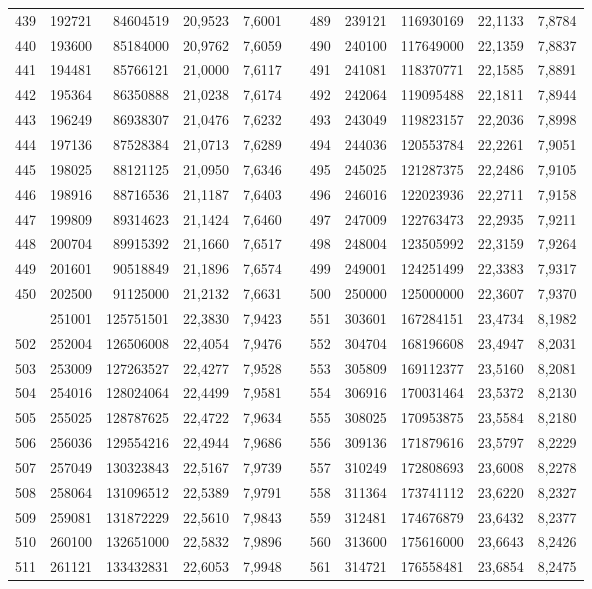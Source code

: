 \begin{longtable}{rrrrrrrrrrr}
439&192721&84604519&20,9523&7,6001&&489&239121&116930169&22,1133&7,8784\\
440&193600&85184000&20,9762&7,6059&&490&240100&117649000&22,1359&7,8837\\
441&194481&85766121&21,0000&7,6117&&491&241081&118370771&22,1585&7,8891\\
442&195364&86350888&21,0238&7,6174&&492&242064&119095488&22,1811&7,8944\\
443&196249&86938307&21,0476&7,6232&&493&243049&119823157&22,2036&7,8998\\
444&197136&87528384&21,0713&7,6289&&494&244036&120553784&22,2261&7,9051\\
445&198025&88121125&21,0950&7,6346&&495&245025&121287375&22,2486&7,9105\\
446&198916&88716536&21,1187&7,6403&&496&246016&122023936&22,2711&7,9158\\
447&199809&89314623&21,1424&7,6460&&497&247009&122763473&22,2935&7,9211\\
448&200704&89915392&21,1660&7,6517&&498&248004&123505992&22,3159&7,9264\\
449&201601&90518849&21,1896&7,6574&&499&249001&124251499&22,3383&7,9317\\
450&202500&91125000&21,2132&7,6631&&500&250000&125000000&22,3607&7,9370\\
\newpage
501&251001&125751501&22,3830&7,9423&&551&303601&167284151&23,4734&8,1982\\
502&252004&126506008&22,4054&7,9476&&552&304704&168196608&23,4947&8,2031\\
503&253009&127263527&22,4277&7,9528&&553&305809&169112377&23,5160&8,2081\\
504&254016&128024064&22,4499&7,9581&&554&306916&170031464&23,5372&8,2130\\
505&255025&128787625&22,4722&7,9634&&555&308025&170953875&23,5584&8,2180\\
506&256036&129554216&22,4944&7,9686&&556&309136&171879616&23,5797&8,2229\\
507&257049&130323843&22,5167&7,9739&&557&310249&172808693&23,6008&8,2278\\
508&258064&131096512&22,5389&7,9791&&558&311364&173741112&23,6220&8,2327\\
509&259081&131872229&22,5610&7,9843&&559&312481&174676879&23,6432&8,2377\\
510&260100&132651000&22,5832&7,9896&&560&313600&175616000&23,6643&8,2426\\
511&261121&133432831&22,6053&7,9948&&561&314721&176558481&23,6854&8,2475\\

\end{longtable}
